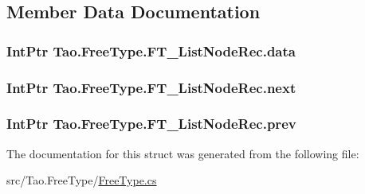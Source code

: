 \subsection{Member Data Documentation}
\hypertarget{struct_tao_1_1_free_type_1_1_f_t___list_node_rec_ac62520315cb08535722892877c6a6245}{
\subsubsection[{data}]{\setlength{\rightskip}{0pt plus 5cm}IntPtr {\bf Tao.FreeType.FT\_\-ListNodeRec.data}}}
\label{struct_tao_1_1_free_type_1_1_f_t___list_node_rec_ac62520315cb08535722892877c6a6245}
\hypertarget{struct_tao_1_1_free_type_1_1_f_t___list_node_rec_a207244252253e22f41a3ddc15bd1415b}{
\subsubsection[{next}]{\setlength{\rightskip}{0pt plus 5cm}IntPtr {\bf Tao.FreeType.FT\_\-ListNodeRec.next}}}
\label{struct_tao_1_1_free_type_1_1_f_t___list_node_rec_a207244252253e22f41a3ddc15bd1415b}
\hypertarget{struct_tao_1_1_free_type_1_1_f_t___list_node_rec_a571ee3756f6fcbb1c48b1759eb83c4e8}{
\subsubsection[{prev}]{\setlength{\rightskip}{0pt plus 5cm}IntPtr {\bf Tao.FreeType.FT\_\-ListNodeRec.prev}}}
\label{struct_tao_1_1_free_type_1_1_f_t___list_node_rec_a571ee3756f6fcbb1c48b1759eb83c4e8}


The documentation for this struct was generated from the following file:\begin{DoxyCompactItemize}
\item 
src/Tao.FreeType/\hyperlink{_free_type_8cs}{FreeType.cs}\end{DoxyCompactItemize}
